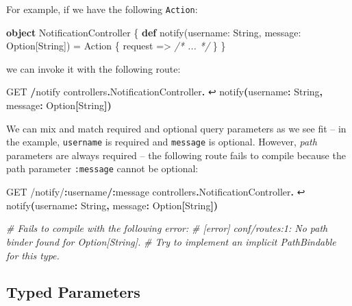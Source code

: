 \documentclass[oneside,11pt,a4paper,]{book}
\newenvironment{Shaded}{\begin{snugshade}}{\end{snugshade}}
\newcommand{\KeywordTok}[1]{\textcolor[rgb]{0.13,0.29,0.53}{\textbf{{#1}}}}
\newcommand{\StringTok}[1]{\textcolor[rgb]{0.31,0.60,0.02}{{#1}}}
\newcommand{\CommentTok}[1]{\textcolor[rgb]{0.56,0.35,0.01}{\textit{{#1}}}}
\newcommand{\OtherTok}[1]{\textcolor[rgb]{0.56,0.35,0.01}{{#1}}}
\newcommand{\FunctionTok}[1]{\textcolor[rgb]{0.00,0.00,0.00}{{#1}}}
\newcommand{\NormalTok}[1]{{#1}}
\begin{document}
For example, if we have the following \texttt{Action}:

\begin{Shaded}
\begin{Highlighting}[]
\KeywordTok{object} \NormalTok{NotificationController \{}
  \KeywordTok{def} \FunctionTok{notify}\NormalTok{(username: String, message: Option[String]) =}
    \NormalTok{Action \{ request => }\CommentTok{/* ... */} \NormalTok{\}}
\NormalTok{\}}
\end{Highlighting}
\end{Shaded}

we can invoke it with the following route:

\begin{Shaded}
\begin{Highlighting}[]
\NormalTok{GET }\KeywordTok{/}\NormalTok{notify controllers}\KeywordTok{.}\NormalTok{NotificationController}\KeywordTok{.} \NormalTok{↩}
  \NormalTok{notify}\KeywordTok{(}\NormalTok{username}\KeywordTok{:} \OtherTok{String}\KeywordTok{,} \NormalTok{message}\KeywordTok{:} \NormalTok{Option}\KeywordTok{[}\OtherTok{String}\KeywordTok{])}
\end{Highlighting}
\end{Shaded}

We can mix and match required and optional query parameters as we see
fit -- in the example, \texttt{username} is required and
\texttt{message} is optional. However, \emph{path} parameters are always
required -- the following route fails to compile because the path
parameter \texttt{:message} cannot be optional:

\begin{Shaded}
\begin{Highlighting}[]
\NormalTok{GET }\StringTok{/notify/}\KeywordTok{:}\NormalTok{username}\KeywordTok{/:}\NormalTok{message controllers}\KeywordTok{.}\NormalTok{NotificationController}\KeywordTok{.} \NormalTok{↩}
  \NormalTok{notify}\KeywordTok{(}\NormalTok{username}\KeywordTok{:} \OtherTok{String}\KeywordTok{,} \NormalTok{message}\KeywordTok{:} \NormalTok{Option}\KeywordTok{[}\OtherTok{String}\KeywordTok{])}

\CommentTok{# Fails to compile with the following error:}
\CommentTok{#     [error] conf/routes:1: No path binder found for Option[String].}
\CommentTok{#     Try to implement an implicit PathBindable for this type.}
\end{Highlighting}
\end{Shaded}

\subsection{Typed Parameters}\label{typed-parameters}
\end{document}
